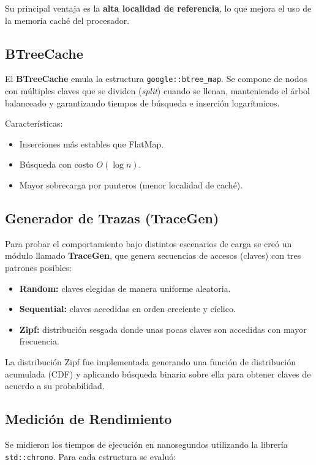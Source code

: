 \documentclass[12pt,a4paper]{article}
\begin{document}
Su principal ventaja es la \textbf{alta localidad de referencia}, lo que mejora el uso de la memoria caché del procesador.

\subsection{BTreeCache}

El \textbf{BTreeCache} emula la estructura \texttt{google::btree\_map}.  
Se compone de nodos con múltiples claves que se dividen (\emph{split}) cuando se llenan,  
manteniendo el árbol balanceado y garantizando tiempos de búsqueda e inserción logarítmicos.  

Características:
\begin{itemize}
    \item Inserciones más estables que FlatMap.
    \item Búsqueda con costo \(O(\log n)\).
    \item Mayor sobrecarga por punteros (menor localidad de caché).
\end{itemize}

\subsection{Generador de Trazas (TraceGen)}

Para probar el comportamiento bajo distintos escenarios de carga se creó un módulo llamado \textbf{TraceGen},  
que genera secuencias de accesos (claves) con tres patrones posibles:

\begin{itemize}
    \item \textbf{Random:} claves elegidas de manera uniforme aleatoria.
    \item \textbf{Sequential:} claves accedidas en orden creciente y cíclico.
    \item \textbf{Zipf:} distribución sesgada donde unas pocas claves son accedidas con mayor frecuencia.
\end{itemize}

La distribución Zipf fue implementada generando una función de distribución acumulada (CDF)  
y aplicando búsqueda binaria sobre ella para obtener claves de acuerdo a su probabilidad.

\subsection{Medición de Rendimiento}

Se midieron los tiempos de ejecución en nanosegundos utilizando la librería \texttt{std::chrono}.  
Para cada estructura se evaluó:
\end{document}
